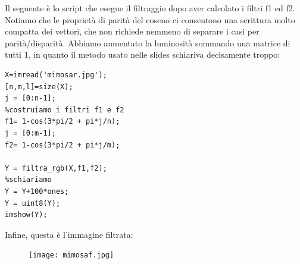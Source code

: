 \documentclass{article}
\begin{document}
\noindent
Il seguente è lo script che esegue il filtraggio dopo aver calcolato i filtri f1 ed f2. Notiamo che le proprietà di parità del coseno ci consentono una scrittura molto compatta dei vettori, che non richiede nemmeno di separare i casi per parità/disparità. Abbiamo aumentato la luminosità sommando una matrice di tutti 1, in quanto il metodo usato nelle slides schiariva decisamente troppo:

\begin{lstlisting}
X=imread('mimosar.jpg');
[n,m,l]=size(X);
j = [0:n-1];
%costruiamo i filtri f1 e f2
f1= 1-cos(3*pi/2 + pi*j/n);
j = [0:m-1];
f2= 1-cos(3*pi/2 + pi*j/m);

Y = filtra_rgb(X,f1,f2);
%schiariamo
Y = Y+100*ones;
Y = uint8(Y);
imshow(Y);
\end{lstlisting}

\noindent
Infine, questa è l'immagine filtrata:

\begin{figure}[!h]
\centering
\texttt{[image: mimosaf.jpg]}
\end{figure}
\end{document}
